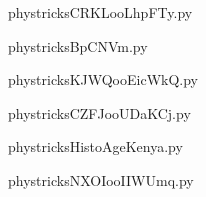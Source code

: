     \newcommand{\CaptionFigCRKLooLhpFTy}{<+Type your caption here+>}
    \begin{center}
        
    \end{center}
    phystricksCRKLooLhpFTy.py

    

    \clearpage
    


    \newcommand{\CaptionFigBpCNVm}{<+Type your caption here+>}
    \begin{center}
        
    \end{center}
    phystricksBpCNVm.py

    

    \clearpage
    


    \newcommand{\CaptionFigKJWQooEicWkQ}{<+Type your caption here+>}
    \begin{center}
        
    \end{center}
    phystricksKJWQooEicWkQ.py

    

    \clearpage
    


    \newcommand{\CaptionFigCZFJooUDaKCj}{<+Type your caption here+>}
    \begin{center}
        
    \end{center}
    phystricksCZFJooUDaKCj.py

    

    \clearpage
    


    \newcommand{\CaptionFigHistoAgeKenya}{<+Type your caption here+>}
    \begin{center}
        
    \end{center}
    phystricksHistoAgeKenya.py

    

    \clearpage
    


    \newcommand{\CaptionFigNXOIooIIWUmq}{<+Type your caption here+>}
    \begin{center}
        
    \end{center}
    phystricksNXOIooIIWUmq.py

